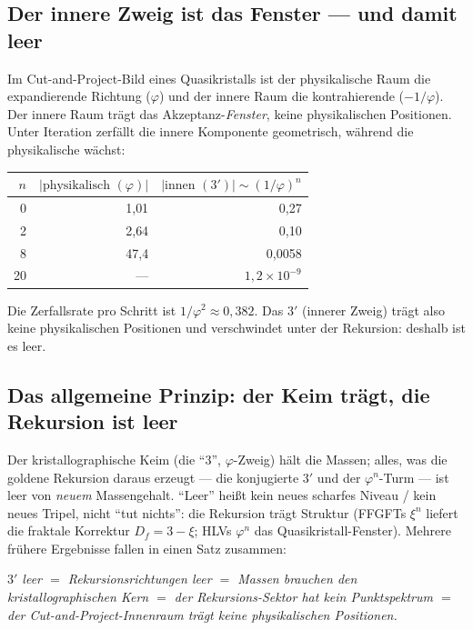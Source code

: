 \subsection{Der innere Zweig ist das Fenster --- und damit leer}
Im Cut-and-Project-Bild eines Quasikristalls ist der physikalische Raum die expandierende
Richtung ($\varphi$) und der innere Raum die kontrahierende ($-1/\varphi$). Der innere Raum
tr\"agt das Akzeptanz-\emph{Fenster}, keine physikalischen Positionen. Unter Iteration zerf\"allt
die innere Komponente geometrisch, w\"ahrend die physikalische w\"achst:
\begin{center}\small
\begin{tabular}{@{}r r r@{}}
\toprule
$n$ & $|\text{physikalisch }(\varphi)|$ & $|\text{innen }(3')|\sim(1/\varphi)^n$ \\
\midrule
0 & 1{,}01 & 0{,}27 \\
2 & 2{,}64 & 0{,}10 \\
8 & 47{,}4 & 0{,}0058 \\
20 & --- & $1{,}2\times10^{-9}$ \\
\bottomrule
\end{tabular}
\end{center}
\noindent Die Zerfallsrate pro Schritt ist $1/\varphi^2\approx0{,}382$. Das $3'$ (innerer Zweig)
tr\"agt also keine physikalischen Positionen und verschwindet unter der Rekursion: deshalb ist
es leer.

\subsection{Das allgemeine Prinzip: der Keim tr\"agt, die Rekursion ist leer}
Der kristallographische Keim (die \enquote{$3$}, $\varphi$-Zweig) h\"alt die Massen; alles, was
die goldene Rekursion daraus erzeugt --- die konjugierte $3'$ und der $\varphi^n$-Turm --- ist
leer von \emph{neuem} Massengehalt. \enquote{Leer} hei\ss t kein neues scharfes Niveau / kein
neues Tripel, nicht \enquote{tut nichts}: die Rekursion tr\"agt Struktur (FFGFTs $\xi^n$ liefert
die fraktale Korrektur $D_f=3-\xi$; HLVs $\varphi^n$ das Quasikristall-Fenster). Mehrere fr\"uhere
Ergebnisse fallen in einen Satz zusammen:
\begin{center}\emph{$3'$ leer $=$ Rekursionsrichtungen leer $=$ Massen brauchen den
kristallographischen Kern $=$ der Rekursions-Sektor hat kein Punktspektrum $=$ der
Cut-and-Project-Innenraum tr\"agt keine physikalischen Positionen.}\end{center}

